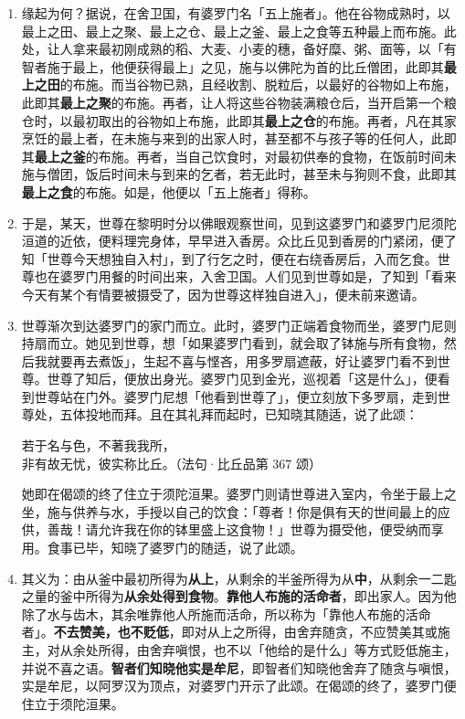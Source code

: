 \begin{enumerate}\item 缘起为何？据说，在舍卫国，有婆罗门名「五上施者」。他在谷物成熟时，以最上之田、最上之聚、最上之仓、最上之釜、最上之食等五种最上而布施。此处，让人拿来最初刚成熟的稻、大麦、小麦的穗，备好糜、粥、面等，以「有智者施于最上，他便获得最上」之见，施与以佛陀为首的比丘僧团，此即其\textbf{最上之田}的布施。而当谷物已熟，且经收割、脱粒后，以最好的谷物如上布施，此即其\textbf{最上之聚}的布施。再者，让人将这些谷物装满粮仓后，当开启第一个粮仓时，以最初取出的谷物如上布施，此即其\textbf{最上之仓}的布施。再者，凡在其家烹饪的最上者，在未施与来到的出家人时，甚至都不与孩子等的任何人，此即其\textbf{最上之釜}的布施。再者，当自己饮食时，对最初供奉的食物，在饭前时间未施与僧团，饭后时间未与到来的乞者，若无此时，甚至未与狗则不食，此即其\textbf{最上之食}的布施。如是，他便以「五上施者」得称。
\item 于是，某天，世尊在黎明时分以佛眼观察世间，见到这婆罗门和婆罗门尼须陀洹道的近依，便料理完身体，早早进入香房。众比丘见到香房的门紧闭，便了知「世尊今天想独自入村」，到了行乞之时，便在右绕香房后，入而乞食。世尊也在婆罗门用餐的时间出来，入舍卫国。人们见到世尊如是，了知到「看来今天有某个有情要被摄受了，因为世尊这样独自进入」，便未前来邀请。
\item 世尊渐次到达婆罗门的家门而立。此时，婆罗门正端着食物而坐，婆罗门尼则持扇而立。她见到世尊，想「如果婆罗门看到，就会取了钵施与所有食物，然后我就要再去煮饭」，生起不喜与悭吝，用多罗扇遮蔽，好让婆罗门看不到世尊。世尊了知后，便放出身光。婆罗门见到金光，巡视着「这是什么」，便看到世尊站在门外。婆罗门尼想「他看到世尊了」，便立刻放下多罗扇，走到世尊处，五体投地而拜。且在其礼拜而起时，已知晓其随适，说了此颂：\begin{quoting}若于名与色，不著我我所，\\非有故无忧，彼实称比丘。（法句·比丘品第 367 颂）\end{quoting}她即在偈颂的终了住立于须陀洹果。婆罗门则请世尊进入室内，令坐于最上之坐，施与供养与水，手授以自己的饮食：「尊者！你是俱有天的世间最上的应供，善哉！请允许我在你的钵里盛上这食物！」世尊为摄受他，便受纳而享用。食事已毕，知晓了婆罗门的随适，说了此颂。
\item 其义为：由从釜中最初所得为\textbf{从上}，从剩余的半釜所得为从\textbf{中}，从剩余一二匙之量的釜中所得为\textbf{从余处得到食物}。\textbf{靠他人布施的活命者}，即出家人。因为他除了水与齿木，其余唯靠他人所施而活命，所以称为「靠他人布施的活命者」。\textbf{不去赞美，也不贬低}，即对从上之所得，由舍弃随贪，不应赞美其或施主，对从余处所得，由舍弃嗔恨，也不以「他给的是什么」等方式贬低施主，并说不喜之语。\textbf{智者们知晓他实是牟尼}，即智者们知晓他舍弃了随贪与嗔恨，实是牟尼，以阿罗汉为顶点，对婆罗门开示了此颂。在偈颂的终了，婆罗门便住立于须陀洹果。\end{enumerate}

